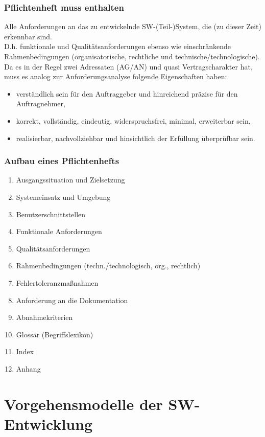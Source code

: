 \documentclass{scrreprt}
\begin{document}
\subsection{Pflichtenheft muss enthalten}
Alle Anforderungen an das zu entwickelnde SW-(Teil-)System, die (zu dieser Zeit) erkennbar sind.\\
D.h. funktionale und Qualitätsanforderungen ebenso wie einschränkende Rahmenbedingungen (organisatorische, rechtliche und technische/technologische).\\
Da es in der Regel zwei Adressaten (AG/AN) und quasi Vertragscharakter hat,
muss es analog zur Anforderungsanalyse folgende Eigenschaften haben:
\begin{itemize}
\item verständlich sein für den Auftraggeber und hinreichend präzise für den
Auftragnehmer,
\item korrekt, vollständig, eindeutig, widerspruchsfrei, minimal, erweiterbar sein,
\item realisierbar, nachvollziehbar und hinsichtlich der Erfüllung überprüfbar sein. 
\end{itemize}

\subsection{Aufbau eines Pflichtenhefts}
\begin{enumerate}
\item Ausgangssituation und Zielsetzung
\item Systemeinsatz und Umgebung
\item Benutzerschnittstellen
\item Funktionale Anforderungen
\item Qualitätsanforderungen
\item Rahmenbedingungen (techn./technologisch, org., rechtlich)
\item Fehlertoleranzmaßnahmen
\item Anforderung an die Dokumentation
\item Abnahmekriterien
\item[] Glossar (Begriffslexikon)
\item[] Index
\item[] Anhang
\end{enumerate}


\chapter{Vorgehensmodelle der SW-Entwicklung}
\end{document}
